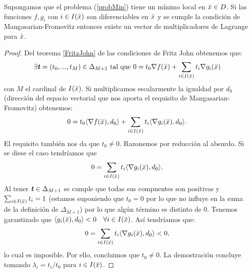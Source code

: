 		\begin{teoremaBox}
		Supongamos que el problema (\ref{probMin}) tiene un mínimo local en $ \bar{x} \in D $. Si las funciones $ f, g_i $ con $ i \in I(\bar{x}) $ son diferenciables en $ \bar{x} $ y se cumple la condición de Mangasarian-Fromovitz entonces existe un vector de multiplicadores de Lagrange para $ \bar{x} $.
		\end{teoremaBox} 
	
		\begin{proof}
		Del teorema \ref{FritzJohn} de las condiciones de Fritz John obtenemos que:
		\[
		\exists \textbf{\emph{t}} = (t_0, ..., t_{M})\in \Delta_{M+1}  \text{ tal que }0 = t_0 \nabla f(\bar{x}) + \sum_{i \in I(\bar{x})}  t_i \nabla g_i (\bar{x})
		\]		
		con $ M $ el cardinal de $ I(\bar{x}) $. Si multiplicamos escalarmente la igualdad por $ d_0 $ (dirección del espacio vectorial que nos aporta el requisito de  Mangasarian-Fromovitz) obtenemos:
		\[
		0 = t_0 \langle \nabla f(\bar{x}), d_0 \rangle + \sum_{i \in I(\bar{x})}  t_i \langle \nabla g_i (\bar{x}), d_0 \rangle.
		\]
		El requisito también nos da que $ t_0 \neq 0$. Razonemos por reducción al absurdo. Si se diese el caso tendríamos que
		\[
		0 = \sum_{i \in I(\bar{x})}  t_i \langle \nabla g_i (\bar{x}), d_0 \rangle.
		\]
		Al tener $ \textbf{\emph{t}} \in \Delta_{M+1} $ se cumple que todas sus compnentes son positivas y $ \sum_{i \in I(\bar{x})}  t_i = 1 $ (estamos suponiendo que $ t_0 = 0 $ por lo que no influye en la suma de la definición de $ \Delta_{M+1} $) por lo que algún término es distinto de 0. Tenemos garantizado que $  \langle g_i (\bar{x}), d_0 \rangle < 0 \quad \forall i \in I(\bar{x}) $. Así tendríamos que:
			\[
		0 = \sum_{i \in I(\bar{x})}  t_i \langle \nabla g_i (\bar{x}), d_0 \rangle < 0,
		\]
		lo cual es imposible. Por ello, concluimos que $ t_0 \neq 0 $. La demostración concluye tomando $ \lambda_i = t_i / t_0 $ para $ i \in I(\bar{x}) $.
		\end{proof}
		